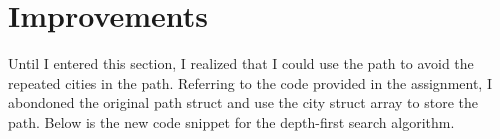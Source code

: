 \documentclass[a4paper,11pt]{article}
\begin{document}
\section*{Improvements}

Until I entered this section, I realized that I could use the path to avoid the repeated cities in the path.
Referring to the code provided in the assignment, I abondoned the original path struct and use the city struct
array to store the path. Below is the new code snippet for the depth-first search algorithm.

\begin{verbatim}

\end{verbatim}
\end{document}
